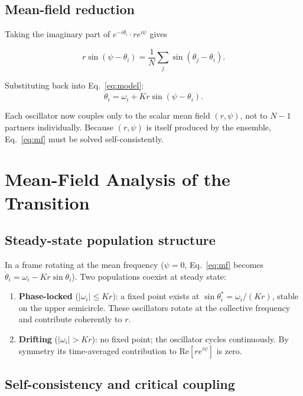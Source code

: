 \documentclass[12pt,a4paper]{article}
\begin{document}
\subsection{Mean-field reduction}

Taking the imaginary part of $e^{-i\theta_i} \cdot r e^{i\psi}$ gives

\[
  r \sin(\psi - \theta_i) = \frac{1}{N}\sum_{j}\sin(\theta_j - \theta_i).
\]

Substituting back into Eq.~\eqref{eq:model}:
\begin{equation}
  \dot{\theta}_i = \omega_i + Kr\sin(\psi - \theta_i).
  \label{eq:mf}
\end{equation}

Each oscillator now couples only to the scalar mean field $(r, \psi)$,
not to $N-1$ partners individually.
Because $(r, \psi)$ is itself produced by the ensemble, Eq.~\eqref{eq:mf}
must be solved self-consistently.

\section{Mean-Field Analysis of the Transition}
\label{sec:mft}

\subsection{Steady-state population structure}

In a frame rotating at the mean frequency ($\psi = 0$,
Eq.~\eqref{eq:mf} becomes $\dot\theta_i = \omega_i - Kr\sin\theta_i$).
Two populations coexist at steady state:

\begin{enumerate}[leftmargin=2.5em, itemsep=4pt]
  \item \textbf{Phase-locked} ($|\omega_i| \leq Kr$):
    a fixed point exists at $\sin\theta_i^* = \omega_i/(Kr)$,
    stable on the upper semicircle.
    These oscillators rotate at the collective frequency and
    contribute coherently to $r$.
  \item \textbf{Drifting} ($|\omega_i| > Kr$):
    no fixed point; the oscillator cycles continuously.
    By symmetry its time-averaged contribution to $\text{Re}[re^{i\psi}]$
    is zero.
\end{enumerate}

\subsection{Self-consistency and critical coupling}
\end{document}
